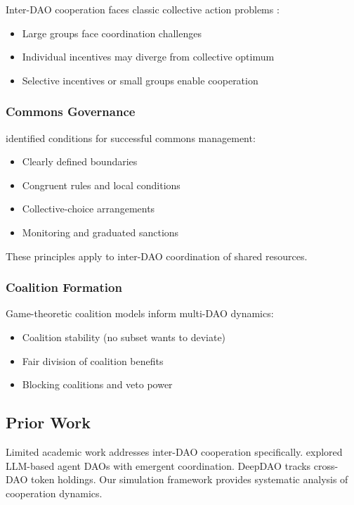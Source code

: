 Inter-DAO cooperation faces classic collective action problems \citep{olson1965logic}:
\begin{itemize}
    \item Large groups face coordination challenges
    \item Individual incentives may diverge from collective optimum
    \item Selective incentives or small groups enable cooperation
\end{itemize}

\subsubsection{Commons Governance}

\citet{ostrom1990governing} identified conditions for successful commons management:
\begin{itemize}
    \item Clearly defined boundaries
    \item Congruent rules and local conditions
    \item Collective-choice arrangements
    \item Monitoring and graduated sanctions
\end{itemize}

These principles apply to inter-DAO coordination of shared resources.

\subsubsection{Coalition Formation}

Game-theoretic coalition models inform multi-DAO dynamics:
\begin{itemize}
    \item Coalition stability (no subset wants to deviate)
    \item Fair division of coalition benefits
    \item Blocking coalitions and veto power
\end{itemize}

\subsection{Prior Work}

Limited academic work addresses inter-DAO cooperation specifically. \citet{tan2023agentdao} explored LLM-based agent DAOs with emergent coordination. DeepDAO \citep{deepdao2023analytics} tracks cross-DAO token holdings. Our simulation framework provides systematic analysis of cooperation dynamics.
